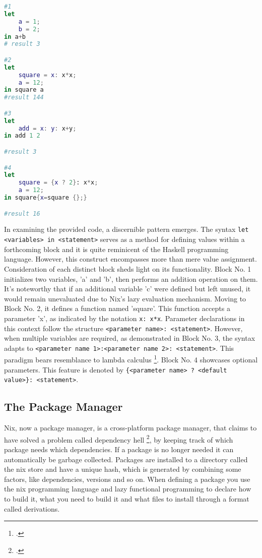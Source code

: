 \begin{minipage}{\textwidth}
\begin{lstlisting}[language=Nix, caption={Simple Examples of the Nix Language}]
#1
let
    a = 1;
    b = 2;
in a+b
# result 3

#2
let
    square = x: x*x;
    a = 12;
in square a
#result 144

#3
let 
    add = x: y: x+y;
in add 1 2

#result 3

#4
let
    square = {x ? 2}: x*x;
    a = 12;
in square{x=square {};}

#result 16
\end{lstlisting}
\end{minipage}


In examining the provided code, a discernible pattern emerges. The syntax \newline \verb+let <variables> in <statement>+ serves as a method for defining values within a forthcoming block and it is quite reminicent of the Haskell programming language. However, this construct encompasses more than mere value assignment.
Consideration of each distinct block sheds light on its functionality. Block No. 1 initializes two variables, 'a' and 'b', then performs an addition operation on them. It's noteworthy that if an additional variable 'c' were defined but left unused, it would remain unevaluated due to Nix's lazy evaluation mechanism.
Moving to Block No. 2, it defines a function named 'square'. This function accepts a parameter 'x', as indicated by the notation \verb+x: x*x+. Parameter declarations in this context follow the structure \verb+<parameter name>: <statement>+. However, when multiple variables are required, as demonstrated in Block No. 3, the syntax adapts to \verb+<parameter name 1>:<parameter name 2>: <statement>+. This paradigm bears resemblance to lambda calculus \footcite{lambda_calculus}.
Block No. 4 showcases optional parameters. This feature is denoted by \newline \verb+{<parameter name> ? <default value>}: <statement>+.


\subsection{The Package Manager}
Nix, now a package manager, is a cross-platform package manager, that claims to have solved a problem called dependency hell \footcite{dependency_hell}, by keeping track of which package needs which dependencies. If a package is no longer needed it can automatically be garbage collected. Packages are installed to a directory called the nix store and have a unique hash, which is generated by combining some factors, like dependencies, versions and so on.
When defining a package you use the nix programming language and lazy functional programming to declare how to build it, what you need to build it and what files to install through a format called derivations.

